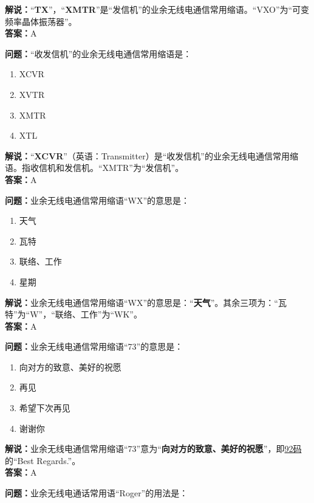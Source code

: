 \textbf{解说：}“\textbf{TX}”，“\textbf{XMTR}”是“发信机”的业余无线电通信常用缩语。“VXO”为“可变频率晶体振荡器”。\\\textbf{答案：}A



\textbf{问题：}“收发信机”的业余无线电通信常用缩语是：

\begin{enumerate}[label=\Alph*), leftmargin=1cm]
	\item XCVR
	\item XVTR
	\item XMTR
	\item XTL
\end{enumerate}

\textbf{解说：}“\textbf{XCVR}”（英语：Transmitter）是“收发信机”的业余无线电通信常用缩语。指收信机和发信机。“XMTR”为“发信机”。\\\textbf{答案：}A



\textbf{问题：}业余无线电通信常用缩语“WX”的意思是：

\begin{enumerate}[label=\Alph*), leftmargin=1cm]
	\item 天气
	\item 瓦特
	\item 联络、工作
	\item 星期
\end{enumerate}

\textbf{解说：}业余无线电通信常用缩语“WX”的意思是：“\textbf{天气}”。其余三项为：“瓦特”为“W”，“联络、工作”为“WK”。\\\textbf{答案：}A



\textbf{问题：}业余无线电通信常用缩语“73”的意思是：

\begin{enumerate}[label=\Alph*), leftmargin=1cm]
	\item 向对方的致意、美好的祝愿
	\item 再见
	\item 希望下次再见
	\item 谢谢你
\end{enumerate}

\textbf{解说：}业余无线电通信常用缩语“73”意为“\textbf{向对方的致意、美好的祝愿}”，即\href{https://en.wikipedia.org/wiki/Wire_signal}{92码}的“Best Regards.”。\\\textbf{答案：}A



\textbf{问题：}业余无线电通话常用语“Roger”的用法是：

